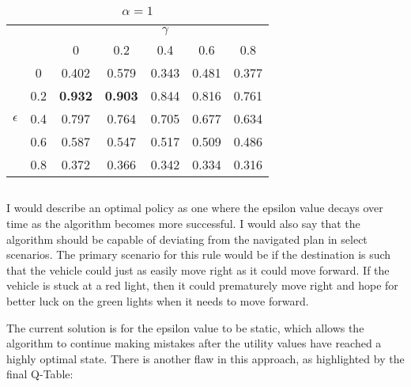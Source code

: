 \documentclass[12pt]{article}
\begin{document}
\vspace{2ex}
\begin{table}[]
\centering
\caption{$\alpha = 1$}
\label{}
\begin{tabular}{|cc|ccccc|}
\hline
            &     &                &                & $\gamma$ &       &       \\ %
            &     & 0              & 0.2            & 0.4      & 0.6   & 0.8   \\ \hline
            & 0   & 0.402          & 0.579          & 0.343    & 0.481 & 0.377 \\ %
            & 0.2 & \textbf{0.932} & \textbf{0.903} & 0.844    & 0.816 & 0.761 \\ %
 $\epsilon$ & 0.4 & 0.797          & 0.764          & 0.705    & 0.677 & 0.634 \\ %
            & 0.6 & 0.587          & 0.547          & 0.517    & 0.509 & 0.486 \\ %
            & 0.8 & 0.372          & 0.366          & 0.342    & 0.334 & 0.316 \\ \hline
\end{tabular}
\end{table}

\subsection{}
I would describe an optimal policy as one where the epsilon value decays over time as the algorithm becomes more successful.
I would also say that the algorithm should be capable of deviating from the navigated plan in select scenarios. 
The primary scenario for this rule would be if the destination is such that the vehicle could just as easily move right as it could move forward.
If the vehicle is stuck at a red light, then it could prematurely move right and hope for better luck on the green lights when it needs to move forward.

The current solution is for the epsilon value to be static, which allows the algorithm to continue making mistakes after the utility values have reached a highly optimal state. There is another flaw in this approach, as highlighted by the final Q-Table:
\end{document}
